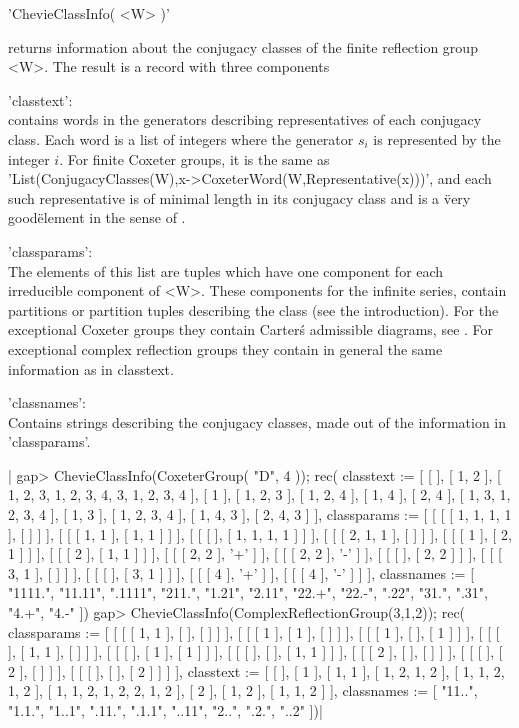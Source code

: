 
'ChevieClassInfo( <W> )'

returns  information about the  conjugacy classes of  the finite reflection
group <W>. The result is a record with three components\:\

'classtext':\\ contains words in the generators  describing representatives
     of  each conjugacy class.  Each word is  a list of  integers where the
     generator  $s_i$ is represented by the integer $i$. For finite Coxeter
     groups, it is the same as
     'List(ConjugacyClasses(W),x->CoxeterWord(W,Representative(x)))',   and
     each  such representative is of minimal  length in its conjugacy class
     and is a \"very good\" element in the sense of \cite{GM97}.

'classparams':\\   The elements of this list are tuples which have one
     component  for each irreducible component of <W>. These components for
     the infinite series, contain partitions or partition tuples describing
     the  class (see the introduction).  For the exceptional Coxeter groups
     they  contain  Carter\'s  admissible  diagrams,  see \cite{Car72}. For
     exceptional complex reflection groups they contain in general the same
     information as in classtext.

'classnames':\\ Contains strings describing  the conjugacy classes, made
     out of the information in 'classparams'.

|    gap> ChevieClassInfo(CoxeterGroup( "D", 4 ));
    rec(
      classtext :=
       [ [  ], [ 1, 2 ], [ 1, 2, 3, 1, 2, 3, 4, 3, 1, 2, 3, 4 ], [ 1 ],
          [ 1, 2, 3 ], [ 1, 2, 4 ], [ 1, 4 ], [ 2, 4 ],
          [ 1, 3, 1, 2, 3, 4 ], [ 1, 3 ], [ 1, 2, 3, 4 ], [ 1, 4, 3 ],
          [ 2, 4, 3 ] ],
      classparams :=
       [ [ [ [ 1, 1, 1, 1 ], [  ] ] ], [ [ [ 1, 1 ], [ 1, 1 ] ] ],
          [ [ [  ], [ 1, 1, 1, 1 ] ] ], [ [ [ 2, 1, 1 ], [  ] ] ],
          [ [ [ 1 ], [ 2, 1 ] ] ], [ [ [ 2 ], [ 1, 1 ] ] ],
          [ [ [ 2, 2 ], '+' ] ], [ [ [ 2, 2 ], '-' ] ],
          [ [ [  ], [ 2, 2 ] ] ], [ [ [ 3, 1 ], [  ] ] ],
          [ [ [  ], [ 3, 1 ] ] ], [ [ [ 4 ], '+' ] ], [ [ [ 4 ], '-' ] ] ],
      classnames := [ "1111.", "11.11", ".1111", "211.", "1.21", "2.11",
          "22.+", "22.-", ".22", "31.", ".31", "4.+", "4.-" ])
    gap> ChevieClassInfo(ComplexReflectionGroup(3,1,2));
    rec(
      classparams :=
       [ [ [ [ 1, 1 ], [  ], [  ] ] ], [ [ [ 1 ], [ 1 ], [  ] ] ],
          [ [ [ 1 ], [  ], [ 1 ] ] ], [ [ [  ], [ 1, 1 ], [  ] ] ],
          [ [ [  ], [ 1 ], [ 1 ] ] ], [ [ [  ], [  ], [ 1, 1 ] ] ],
          [ [ [ 2 ], [  ], [  ] ] ], [ [ [  ], [ 2 ], [  ] ] ],
          [ [ [  ], [  ], [ 2 ] ] ] ],
      classtext :=
       [ [  ], [ 1 ], [ 1, 1 ], [ 1, 2, 1, 2 ], [ 1, 1, 2, 1, 2 ],
          [ 1, 1, 2, 1, 2, 2, 1, 2 ], [ 2 ], [ 1, 2 ], [ 1, 1, 2 ] ],
      classnames := [ "11..", "1.1.", "1..1", ".11.", ".1.1", "..11",
          "2..", ".2.", "..2" ])|

